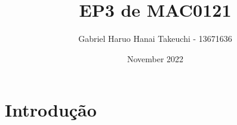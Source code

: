 \documentclass{article}
\title{EP3 de MAC0121}
\author{Gabriel Haruo Hanai Takeuchi - 13671636}
\date{November 2022}
\begin{document}
    \maketitle
    \section*{Introdução}
\end{document}
